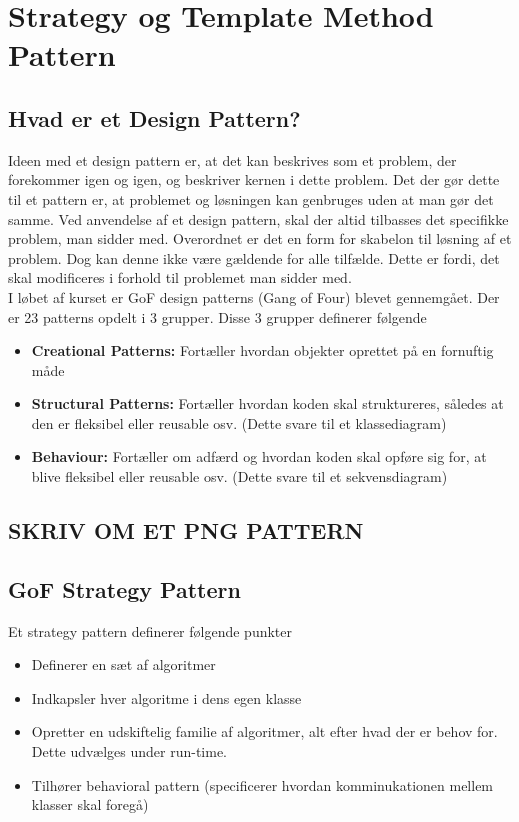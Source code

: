 \documentclass[../SWD_disp.tex]{subfiles}
\begin{document}
\section{Strategy og Template Method Pattern}

\subsection*{Hvad er et Design Pattern?}
Ideen med et design pattern er, at det kan beskrives som et problem, der forekommer igen og igen, og beskriver kernen i dette problem. Det der gør dette til et pattern er, at problemet og løsningen kan genbruges uden at man gør det samme. Ved anvendelse af et design pattern, skal der altid tilbasses det specifikke problem, man sidder med. Overordnet er det en form for skabelon til løsning af et problem. Dog kan denne ikke være gældende for alle tilfælde. Dette er fordi, det skal modificeres i forhold til problemet man sidder med.
\\

I løbet af kurset er GoF design patterns (Gang of Four) blevet gennemgået. Der er 23 patterns opdelt i 3 grupper. Disse 3 grupper definerer følgende

\begin{itemize}
    \item \textbf{Creational Patterns:} Fortæller hvordan objekter oprettet på en fornuftig måde
    \item \textbf{Structural Patterns:} Fortæller hvordan koden skal struktureres, således at den er fleksibel eller reusable osv. (Dette svare til et klassediagram)
    \item \textbf{Behaviour:} Fortæller om adfærd og hvordan koden skal opføre sig for, at blive fleksibel eller reusable osv. (Dette svare til et sekvensdiagram)
\end{itemize}
\subsection{SKRIV OM ET PNG PATTERN}
\subsection*{GoF Strategy Pattern}
Et strategy pattern definerer følgende punkter

\begin{itemize}
    \item Definerer en sæt af algoritmer
    \item Indkapsler hver algoritme i dens egen klasse
    \item Opretter en udskiftelig familie af algoritmer, alt efter hvad der er behov for. Dette udvælges under run-time.
    \item Tilhører behavioral pattern (specificerer hvordan komminukationen mellem klasser skal foregå)
\end{itemize}
\end{document}
